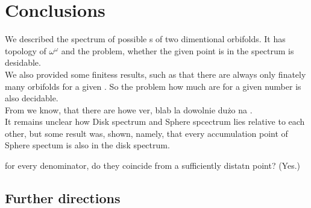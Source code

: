 \chapter{Conclusions}

We described the spectrum of possible \Eoc s of two dimentional orbifolds. 
It has topology of $\omega^\omega$ and the problem, whether the given point is in the 
spectrum is desidable. \\

We also provided some finitess results, such as that there are always only finately many 
orbifolds for a given \Eoc. So the problem how much are for a given number is also decidable.\\

From  we know, that there are howe ver, blab la dowolnie dużo na \Eoc. \\

It remains unclear how Disk spectrum and Sphere spcectrum lies relative to each other, 
but some result was, shown, namely, that every accumulation point of Sphere spectum
is also in the disk spectrum.

for every denominator, do they coincide 
from a sufficiently distatn point? (Yes.) 

\section{Further directions}
